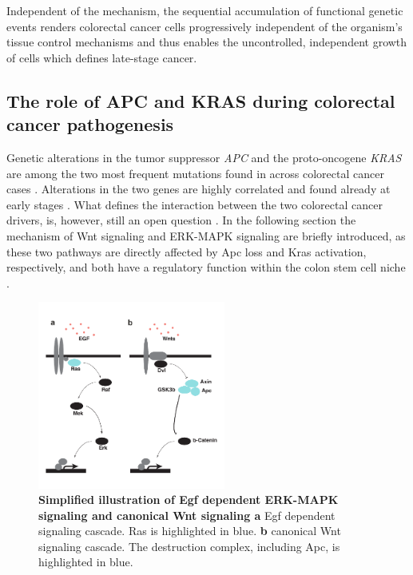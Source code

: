 \begin{flushleft}
Independent of the mechanism, the sequential accumulation of functional genetic events renders colorectal cancer cells progressively independent of the organism's tissue control mechanisms and thus enables the uncontrolled, independent growth of cells which defines late-stage cancer.

\subsection{The role of APC and KRAS during colorectal cancer pathogenesis}
Genetic alterations in the tumor suppressor \textit{APC} and the proto-oncogene \textit{KRAS} are among the two most frequent mutations found in across colorectal cancer cases \parencite{markowitzMolecularOriginsCancer2009}. Alterations in the two genes are highly correlated and found already at early stages \parencite{minaConditionalSelectionGenomic2017}. What defines the interaction between the two colorectal cancer drivers, is, however, still an open question \parencite{parsonsWNTDriverDependency2021}. In the following section the mechanism of Wnt signaling and ERK-MAPK signaling are briefly introduced, as these two pathways are directly affected by Apc loss and Kras activation, respectively, and both have a regulatory function within the colon stem cell niche \parencite{hTalesCryptNew2019}.

\begin{figure}[h]
\centering
\includegraphics[width=0.55\textwidth,
                keepaspectratio]{figures/adenomaprofiling/pdf/fig_0_1.pdf}
\caption[Simplified illustration of ERK-MAPK signaling and canonical Wnt signaling]{\textbf{Simplified illustration of Egf dependent ERK-MAPK signaling and canonical Wnt signaling a} Egf dependent signaling cascade. Ras is highlighted in blue. \textbf{b} canonical Wnt signaling cascade. The destruction complex, including Apc, is highlighted in blue.}
\label{fig_180}
\end{figure}
\bigbreak


\end{flushleft}
